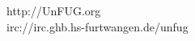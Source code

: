 \documentclass[
    headinclude=false,
    footinclude=false,
    paper=A3,
    paper=portrait,
    pagesize
]{scrartcl}
\begin{document}
    \vfill{}

    \begin{mdframed}[style=mdunfugblank]
        \begin{center}
            \begin{huge}
                http://UnFUG.org \\
                irc://irc.ghb.hs-furtwangen.de/unfug
            \end{huge}
        \end{center}
    \end{mdframed}
\end{document}
